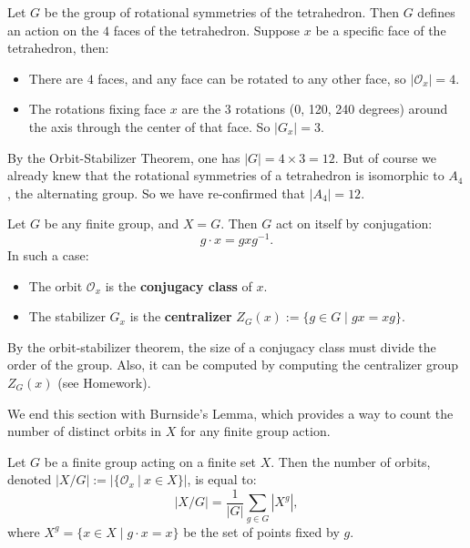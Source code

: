 \begin{example}
Let $G$ be the group of rotational symmetries of the tetrahedron. Then $G$ defines an action on the $4$ faces of the tetrahedron. Suppose $x$ be a specific face of the tetrahedron, then:
\begin{itemize}
    \item There are $4$ faces, and any face can be rotated to any other face, so $|\mathcal{O}_x| = 4$.
    \item The rotations fixing face $x$ are the $3$ rotations (0, 120, 240 degrees) around the axis through the center of that face. So $|G_x| = 3$.    
\end{itemize}
By the Orbit-Stabilizer Theorem, one has $|G| = 4 \times 3 = 12$. But of course we already knew that the rotational symmetries of a tetrahedron is isomorphic to $A_4$, the alternating group. So we have re-confirmed that $|A_4| = 12$.
\end{example}

\begin{example}
Let $G$ be any finite group, and $X = G$. Then $G$ act on itself by conjugation: 
$$g \cdot x = gxg^{-1}.$$
In such a case:
\begin{itemize}
    \item The orbit $\mathcal{O}_x$ is the \textbf{conjugacy class} of $x$.
    \item The stabilizer $G_x$ is the \textbf{centralizer} $Z_G(x) := \{g \in G \mid gx = xg\}$.
\end{itemize}
By the orbit-stabilizer theorem, the size of a conjugacy class must divide the order of the group. Also, it can be computed by computing the centralizer group $Z_G(x)$ (see Homework). 
\end{example}

We end this section with Burnside's Lemma, which provides a way to count the number of distinct orbits in $X$ for any finite group action. 
\begin{theorem}
Let $G$ be a finite group acting on a finite set $X$. Then the number of orbits, denoted $|X/G| := |\{\mathcal{O}_x\ |\ x \in X\}|$, is equal to:
\[ |X/G| = \frac{1}{|G|} \sum_{g \in G} |X^g|, \]
where $X^g = \{ x \in X \mid g \cdot x = x \}$ be the set of points fixed by $g$.
\end{theorem}


